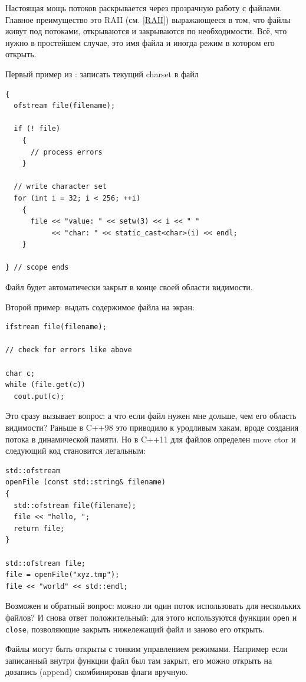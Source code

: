 \documentclass[a4paper,12pt,oneside]{article}
\begin{document}
Настоящая мощь потоков раскрывается через прозрачную работу с файлами. Главное преимущество это RAII (см. \ref{RAII}) выражающееся в том, что файлы живут под потоками, открываются и закрываются по необходимости. Всё, что нужно в простейшем случае, это имя файла и иногда режим в котором его открыть.

Первый пример из \cite{josuttis2}: записать текущий charset в файл

\begin{lstlisting}
{
  ofstream file(filename);

  if (! file) 
    {
      // process errors
    }

  // write character set
  for (int i = 32; i < 256; ++i) 
    {
      file << "value: " << setw(3) << i << " " 
           << "char: " << static_cast<char>(i) << endl;
    }

} // scope ends
\end{lstlisting}

Файл будет автоматически закрыт в конце своей области видимости.

Второй пример: выдать содержимое файла на экран:

\begin{lstlisting}
ifstream file(filename);

// check for errors like above

char c;
while (file.get(c)) 
  cout.put(c);
\end{lstlisting}

Это сразу вызывает вопрос: а что если файл нужен мне дольше, чем его область видимости? Раньше в C++98 это приводило к уродливым хакам, вроде создания потока в динамической памяти. Но в C++11 для файлов определен move ctor и следующий код становится легальным:

\begin{lstlisting}
std::ofstream 
openFile (const std::string& filename)
{
  std::ofstream file(filename);
  file << "hello, ";
  return file;
}

std::ofstream file;
file = openFile("xyz.tmp");
file << "world" << std::endl;
\end{lstlisting}

Возможен и обратный вопрос: можно ли один поток использовать для нескольких файлов? И снова ответ положительный: для этого используются функции \lstinline!open! и \lstinline!close!, позволяющие закрыть нижележащий файл и заново его открыть.

Файлы могут быть открыты с тонким управлением режимами. Например если записанный внутри функции файл был там закрыт, его можно открыть на дозапись (append) скомбинировав флаги вручную.
\end{document}
